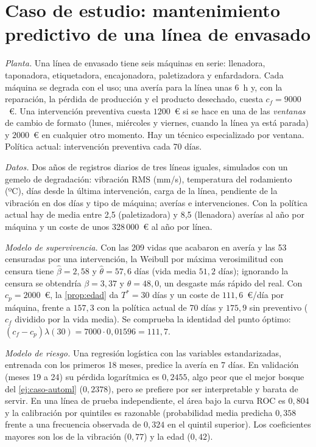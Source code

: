 \section{Caso de estudio: mantenimiento predictivo de una línea de envasado}

\begin{ejemplo}\label{ej:caso-mant}
\emph{Planta.} Una línea de envasado tiene seis máquinas en serie: llenadora, taponadora, etiquetadora, encajonadora, paletizadora y enfardadora. Cada máquina se degrada con el uso; una avería para la línea unas 6~h y, con la reparación, la pérdida de producción y el producto desechado, cuesta $c_f=9000$~€. Una intervención preventiva cuesta $1200$~€ si se hace en una de las \emph{ventanas} de cambio de formato (lunes, miércoles y viernes, cuando la línea ya está parada) y $2000$~€ en cualquier otro momento. Hay un técnico especializado por ventana. Política actual: intervención preventiva cada 70 días.

\emph{Datos.} Dos años de registros diarios de tres líneas iguales, simulados con un gemelo de degradación: vibración RMS (mm/s), temperatura del rodamiento (ºC), días desde la última intervención, carga de la línea, pendiente de la vibración en dos días y tipo de máquina; averías e intervenciones. Con la política actual hay de media entre 2{,}5 (paletizadora) y 8{,}5 (llenadora) averías al año por máquina y un coste de unos 328\,000~€ al año por línea.

\emph{Modelo de supervivencia.} Con las 209 vidas que acabaron en avería y las 53 censuradas por una intervención, la Weibull por máxima verosimilitud con censura tiene $\hat\beta=2{,}58$ y $\hat\theta=57{,}6$ días (vida media $51{,}2$ días); ignorando la censura se obtendría $\beta=3{,}37$ y $\theta=48{,}0$, un desgaste más rápido del real. Con $c_p=2000$~€, la \cref{prop:edad} da $T^{*}=30$ días y un coste de $111{,}6$~€/día por máquina, frente a $157{,}3$ con la política actual de 70 días y $175{,}9$ sin preventivo ($c_f$ dividido por la vida media). Se comprueba la identidad del punto óptimo: $(c_f-c_p)\lambda(30)=7000\cdot0{,}01596=111{,}7$.

\emph{Modelo de riesgo.} Una regresión logística con las variables estandarizadas, entrenada con los primeros 18 meses, predice la avería en 7 días. En validación (meses 19 a 24) su pérdida logarítmica es $0{,}2455$, algo peor que el mejor bosque del \cref{ej:caso-automl} ($0{,}2378$), pero se prefiere por ser interpretable y barata de servir. En una línea de prueba independiente, el área bajo la curva ROC es $0{,}804$ y la calibración por quintiles es razonable (probabilidad media predicha $0{,}358$ frente a una frecuencia observada de $0{,}324$ en el quintil superior). Los coeficientes mayores son los de la vibración ($0{,}77$) y la edad ($0{,}42$).


\end{ejemplo}
